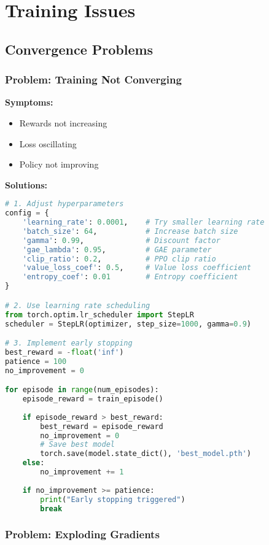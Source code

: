 \section{Training Issues}

\subsection{Convergence Problems}

\subsubsection{Problem: Training Not Converging}

\textbf{Symptoms:}
\begin{itemize}
    \item Rewards not increasing
    \item Loss oscillating
    \item Policy not improving
\end{itemize}

\textbf{Solutions:}

\begin{lstlisting}[language=python, caption=Fix Convergence Issues]
# 1. Adjust hyperparameters
config = {
    'learning_rate': 0.0001,    # Try smaller learning rate
    'batch_size': 64,           # Increase batch size
    'gamma': 0.99,              # Discount factor
    'gae_lambda': 0.95,         # GAE parameter
    'clip_ratio': 0.2,          # PPO clip ratio
    'value_loss_coef': 0.5,     # Value loss coefficient
    'entropy_coef': 0.01        # Entropy coefficient
}

# 2. Use learning rate scheduling
from torch.optim.lr_scheduler import StepLR
scheduler = StepLR(optimizer, step_size=1000, gamma=0.9)

# 3. Implement early stopping
best_reward = -float('inf')
patience = 100
no_improvement = 0

for episode in range(num_episodes):
    episode_reward = train_episode()
    
    if episode_reward > best_reward:
        best_reward = episode_reward
        no_improvement = 0
        # Save best model
        torch.save(model.state_dict(), 'best_model.pth')
    else:
        no_improvement += 1
    
    if no_improvement >= patience:
        print("Early stopping triggered")
        break
\end{lstlisting}

\subsubsection{Problem: Exploding Gradients}

